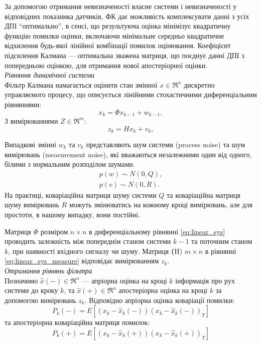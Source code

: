 За допомогою отримання невизначеності власне системи і невизначеності у відповідних 
показника датчиків, ФК дає можливість комплексувати данні з усіх ДПІ “оптимально”, в 
сенсі, що результуюча оцінка мінімізує квадратичну функцію помилки оцінки, включаючи 
мінімальне середньо квадратичне відхилення будь-якої лінійної комбінації помилок оцінювання. 
Коефіцієнт підсилення Калмана — оптимальна зважена матриця, що поєднує данні ДПІ з попередньою 
оцінкою, для отримання нової апостеріорної оцінки.\\


\textit{Рівняння динамічної системи}\\

Фільтр Калмана намагається оцінити стан змінної $x\in \Re^{n}$ дискретно управляємого
процесу, що описується лінійними стохастичними диференціальним рівняннями:
\begin{equation}
\label{eq:linear_sys}
x_{k} = \Phi x_{k-1} + w_{k-1},
\end{equation}
З вимірюваннями  $Z\in \Re^{m}$:
\begin{equation}
\label{eq:linear_sys_measure}
z_{k} = Hx_{k} +v_{k},
\end{equation}

Випадкові змінні $w_{k}$ та $v_{k}$ представляють шум системи (process noise) та 
шум вимірювань (measurement noise), які вважаються незалежними один від одного,
білими з нормальним розподілом шумами.
\begin{eqnarray} 
\label{eq:pw} p(w)\sim N(0,Q), \\
\label{eq:pv} p(v)\sim N(0,R).
\end{eqnarray} 
На практиці, коваріаційна матриця шуму системи $Q$ та коваріаційна
матриця шуму вимірювань $R$ можуть змінюватись на кожному кроці вимірювань,
але для простоти, в нашому випадку, вони постійні.

Матриця $\Phi$ розміром $n \times n$ в диференціальному рівнянні \eqref{eq:linear_sys}
проводить залежність між попереднім станом системи $k-1$ та поточним станом
$k$, при наявності вхідного сигналу чи шуму. Матриця \textbf(H) $m \times n$ в 
рівнянні \eqref{eq:linear_sys_measure} відповідає вимірюванням $z_{k}$. \\

\textit{Отримання рівнянь фільтра}\\

Позначимо $\hat{x}(-) \in \Re^{n}$ --- апріорна оцінка на кроці $k$ 
інформація про рух системи до кроку $k$, та $\hat{x}(+) \in \Re^{n}$
апостеріорна оцінка на кроці $k$ за допомогою вимірювань $z_{k}$. 
Відповідно апріорна оцінка коваріації помилки:
\begin{equation}
\label{eq:p_minux}
P_{k}(-)= E[(x_{k}-\hat{x}_{k}(-))(x_{k}-\hat{x}_{k}(-))_{T}]
\end{equation}
та апостеріорна коваріаційна матриця помилок:
\begin{equation}
\label{eq:p_plus}
P_{k}(+)= E[(x_{k}-\hat{x}_{k}(+))(x_{k}-\hat{x}_{k}(+))_{T}]
\end{equation}

